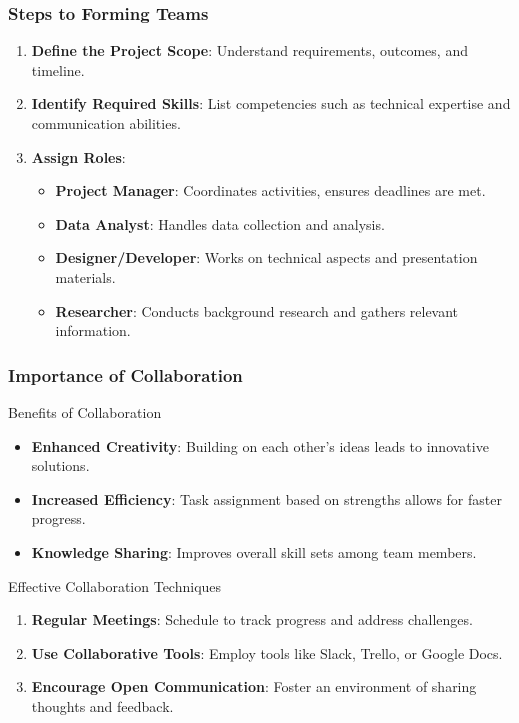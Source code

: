 \documentclass[aspectratio=169]{beamer}
\begin{document}
\begin{frame}[fragile]
    \frametitle{Steps to Forming Teams}
    \begin{enumerate}
        \item \textbf{Define the Project Scope}: Understand requirements, outcomes, and timeline.
        \item \textbf{Identify Required Skills}: List competencies such as technical expertise and communication abilities.
        \item \textbf{Assign Roles}:
        \begin{itemize}
            \item \textbf{Project Manager}: Coordinates activities, ensures deadlines are met.
            \item \textbf{Data Analyst}: Handles data collection and analysis.
            \item \textbf{Designer/Developer}: Works on technical aspects and presentation materials.
            \item \textbf{Researcher}: Conducts background research and gathers relevant information.
        \end{itemize}
    \end{enumerate}
\end{frame}

\begin{frame}[fragile]
    \frametitle{Importance of Collaboration}
    \begin{block}{Benefits of Collaboration}
        \begin{itemize}
            \item \textbf{Enhanced Creativity}: Building on each other's ideas leads to innovative solutions.
            \item \textbf{Increased Efficiency}: Task assignment based on strengths allows for faster progress.
            \item \textbf{Knowledge Sharing}: Improves overall skill sets among team members.
        \end{itemize}
    \end{block}

    \begin{block}{Effective Collaboration Techniques}
        \begin{enumerate}
            \item \textbf{Regular Meetings}: Schedule to track progress and address challenges.
            \item \textbf{Use Collaborative Tools}: Employ tools like Slack, Trello, or Google Docs.
            \item \textbf{Encourage Open Communication}: Foster an environment of sharing thoughts and feedback.
        \end{enumerate}
    \end{block}
\end{frame}
\end{document}
